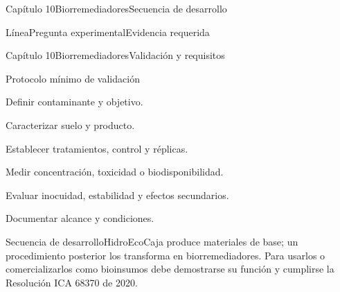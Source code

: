 \documentclass{../plantilla/hvtbook}
\begin{document}
\begin{HVTPage}{Capítulo 10}{Biorremediadores}{Secuencia de desarrollo}
\begin{HVTFlow}\end{HVTFlow}
\begin{HVTTable}{Línea}{Pregunta experimental}{Evidencia requerida}
\end{HVTTable}
\end{HVTPage}

\begin{HVTPage}{Capítulo 10}{Biorremediadores}{Validación y requisitos}
\begin{HVTTaskOrdered}{Protocolo mínimo de validación}\item Definir contaminante y objetivo. \item Caracterizar suelo y producto. \item Establecer tratamientos, control y réplicas. \item Medir concentración, toxicidad o biodisponibilidad. \item Evaluar inocuidad, estabilidad y efectos secundarios. \item Documentar alcance y condiciones.\end{HVTTaskOrdered}
\begin{HVTWarning}{Secuencia de desarrollo}HidroEcoCaja produce materiales de base; un procedimiento posterior los transforma en biorremediadores. Para usarlos o comercializarlos como bioinsumos debe demostrarse su función y cumplirse la Resolución ICA 68370 de 2020. \end{HVTWarning}
\end{HVTPage}
\end{document}
